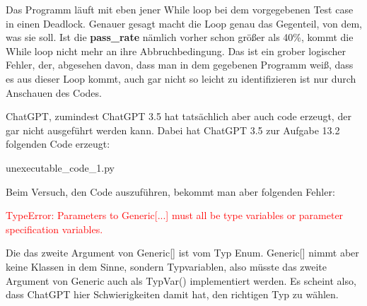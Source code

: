 \documentclass[class=scrbook, crop=false]{standalone}
\begin{document}
    Das Programm läuft mit eben jener While loop bei dem vorgegebenen Test case in einen Deadlock.
    Genauer gesagt macht die Loop genau das Gegenteil, von dem, was sie soll.
    Ist die \textbf{pass\_rate} nämlich vorher schon größer als 40\%, kommt die While loop nicht mehr an ihre Abbruchbedingung.
    Das ist ein grober logischer Fehler, der, abgesehen davon, dass man in dem gegebenen Programm weiß, dass es aus dieser
    Loop kommt, auch gar nicht so leicht zu identifizieren ist nur durch Anschauen des Codes.

    ChatGPT, zumindest ChatGPT 3.5 hat tatsächlich aber auch code erzeugt, der gar nicht ausgeführt werden kann.
    Dabei hat ChatGPT 3.5 zur Aufgabe 13.2 folgenden Code erzeugt:
    
    {unexecutable_code_1.py}

    Beim Versuch, den Code auszuführen, bekommt man aber folgenden Fehler:

    \textcolor{red} {
        TypeError: Parameters to Generic[...] must all be type variables or parameter specification variables.
    }

    Die das zweite Argument von Generic[] ist vom Typ Enum.
    Generic[] nimmt aber keine Klassen in dem Sinne, sondern Typvariablen, also müsste das zweite Argument von Generic auch als TypVar() implementiert werden.
    Es scheint also, dass ChatGPT hier Schwierigkeiten damit hat, den richtigen Typ zu wählen.
\end{document}
